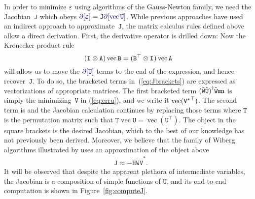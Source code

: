 \documentclass[runningheads]{llncs}
\def\eqref#1{(\ref{eq:#1})}
\def\eqlabel#1{\label{eq:#1}}
\def\tr{^\top}
\def\vec{\operatorname{vec}}
\def\m#1{\ensuremath{\mathtt{#1}}}
\def\v#1{\ensuremath{\mathbf{#1}}}
\def\mU{\m U}
\def\mV{\m V}
\def\mW{\m W}
\def\twiddle#1{{\tilde{#1}}}
\def\tU{\twiddle\mU}
\def\tW{\twiddle\mW}
\def\tVstar{{\twiddle\mV}^*}
\begin{document}
In order to minimize $\varepsilon$ using algorithms of the Gauss-Newton family, we need the Jacobian~$\m J$ which obeys $\diff[\verru] = \m J \diff[\vec\mU]$.  While previous approaches have used an indirect approach to approximate~\m J, the matrix calculus rules defined above allow a direct derivation.  First, the derivative operator is drilled down:
\def\awfhl#1{\Bigl[#1\Bigr]}
\dEpsOnePartOne
Now the Kronecker product rule
\begin{equation}
(\kron{\Id{}}{\m A}) \vec \m B = (\kron{\m B \tr}{\Id{}}) \vec{\m A}
\eqlabel{kronvec}
\end{equation}
will allow us to move the $\diff[\mU]$ terms to the end of the expression, and hence recover~$\m J$.   To do so, the bracketed terms in~\eqref{Jbrackets} are expressed as vectorizations of appropriate matrices.
The first bracketed term $\pinv{(\tW\tU)} \tW \v m$ is simply the minimizing~$\mV$ in \eqref{erru}, and we write it $\vec(\Vstar\tr)$. The second term is
\toVecDot
and the Jacobian calculation continues by replacing those terms
\def\Ttrans{\m{T}}
\dEpsOne
where $\Ttrans$ is the permutation matrix such that $\Ttrans\vec\mU = \vec(\mU\tr)$.   The object in the square brackets is the desired Jacobian, which to the best of our knowledge has not previously been derived. Moreover, we believe that the family of Wiberg algorithms illustrated by \cite{okatani2006wiberg} uses an approximation of the object above
\begin{align}
&\m J \approx - \m H \tW \tVstar.
\end{align}
It will be observed that despite the apparent plethora of intermediate variables, the Jacobian is a composition of simple functions of $\m U$, and its end-to-end computation is shown in Figure~\ref{fig:computeJ}.
\end{document}
